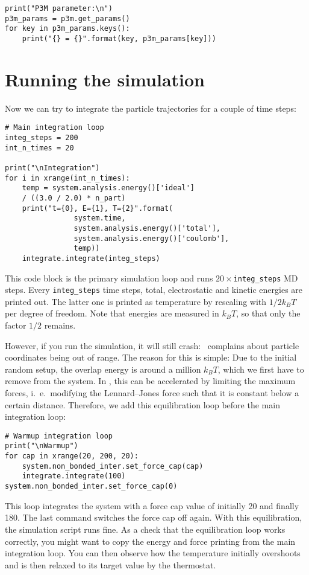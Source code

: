 \documentclass[
a4paper,                        %
11pt,                           %
twoside,                        %
footsepline,                    %
headsepline,                    %
headexclude,                    %
footexclude,                    %
pagesize,                       %
]{scrartcl}
\begin{document}
\begin{lstlisting}
print("P3M parameter:\n")
p3m_params = p3m.get_params()
for key in p3m_params.keys():
    print("{} = {}".format(key, p3m_params[key]))
\end{lstlisting}

\section{Running the simulation}

Now we can try to integrate the particle trajectories for a couple of time
steps:

\begin{lstlisting}
# Main integration loop
integ_steps = 200
int_n_times = 20

print("\nIntegration")
for i in xrange(int_n_times):
    temp = system.analysis.energy()['ideal'] 
    / ((3.0 / 2.0) * n_part)
    print("t={0}, E={1}, T={2}".format(
                system.time,
                system.analysis.energy()['total'], 
                system.analysis.energy()['coulomb'], 
                temp))
    integrate.integrate(integ_steps)
\end{lstlisting}

This code block is the primary simulation loop and runs
$20\times$\verb|integ_steps| MD steps. Every \verb|integ_steps| time
steps, total, electrostatic and kinetic energies are printed
out. The latter one is printed as temperature by rescaling with $1/2 k_B T$ per
degree of freedom. Note that energies are measured in
$k_B T$, so that only the factor $1/2$ remains.

However, if you run the simulation, it will still
crash: \es\ complains about particle coordinates being out of range.
The reason for this is simple: Due to the initial random setup, the
overlap energy is around a million $k_B T$, which we first have to remove
from the system. In \es, this can be accelerated by limiting the maximum
forces, i.~e.\ modifying the Lennard--Jones force such that it is
constant below a certain distance. Therefore, we add this equilibration loop
before the main integration loop:

\begin{lstlisting}
# Warmup integration loop
print("\nWarmup")
for cap in xrange(20, 200, 20):
    system.non_bonded_inter.set_force_cap(cap)
    integrate.integrate(100)
system.non_bonded_inter.set_force_cap(0)
\end{lstlisting}

This loop integrates the system with a force cap value of initially 20 and
finally 180. The last command switches the force cap off again. With
this equilibration, the simulation script runs fine. As a check
that the equilibration loop works correctly, you might want to copy the
energy and force printing from the main integration loop. You can then
observe how the temperature initially overshoots and is then relaxed to
its target value by the thermostat.
\end{document}
